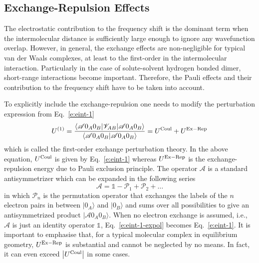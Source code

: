 \documentclass[b5paper,oneside,fleqn,11pt]{book}
\begin{document}
\begin{refsection}
\subsection{Exchange-Repulsion Effects\label{s:dw-exrep}}

The electrostatic contribution to the frequency shift is the dominant term 
when the intermolecular distance is sufficiently large enough to ignore 
any wavefunction overlap. However, in general, the exchange effects
are non\hyp{}negligible for typical van der Waals complexes, at least to the first\hyp{}order
in the intermolecular interaction. Particularly 
in the case of solute\hyp{}solvent hydrogen bonded dimer, 
short\hyp{}range interactions become important. 
Therefore, the Pauli effects and their contribution to the frequency shift have to be taken into account.

To explicitly include the exchange\hyp{}repulsion one needs to
modify the perturbation expression from Eq.~\eqref{e:eint-1}
%
\begin{equation} \label{e:eint-1-expol}
U^{(1)} = 
\frac{
\langle \mathscr{A} 0_A0_B \lvert \mathscr{V}_{AB} \rvert \mathscr{A} 0_A0_B \rangle 
}{
\langle \mathscr{A} 0_A0_B \vert \mathscr{A} 0_A0_B \rangle 
}
= U^{\rm Coul} + U^{\rm Ex-Rep}
\end{equation}
%
which is called the first\hyp{}order exchange perturbation theory.
In the above equation, $U^{\rm Coul}$ is given by Eq.~\eqref{e:eint-1}
whereas $U^{\rm Ex-Rep}$ is the exchange\hyp{}repulsion
energy due to Pauli exclusion principle.
The operator $\mathscr{A}$ is a standard antisymmetrizer which
can be expanded in the following series
%
\begin{equation} \label{e:antisymmetrizer-series}
 \mathscr{A} = \mathbb{1} - \mathscr{P}_1 + \mathscr{P}_2 + \ldots
\end{equation}
%
in which $\mathscr{P}_n$ is the permutation operator that exchanges the labels 
of the $n$ electron pairs in between $\vert 0_A \rangle$ and $\vert 0_B \rangle$
and sums over all possibilities to give an antisymmetrized product
$\vert \mathscr{A} 0_A0_B \rangle $. When no electron exchange is
assumed, i.e., $\mathscr{A}$ is just an identity operator $\mathbb{1}$, 
Eq.~\eqref{e:eint-1-expol} becomes Eq.~\eqref{e:eint-1}. It is important to emphasise that, for 
a typical molecular complex in equilibrium geometry, $U^{\rm Ex-Rep}$
is substantial and cannot be neglected by no means. In fact, it can even 
exceed $\left|U^{\rm Coul}\right|$ in some cases.


\end{refsection}
\end{document}
